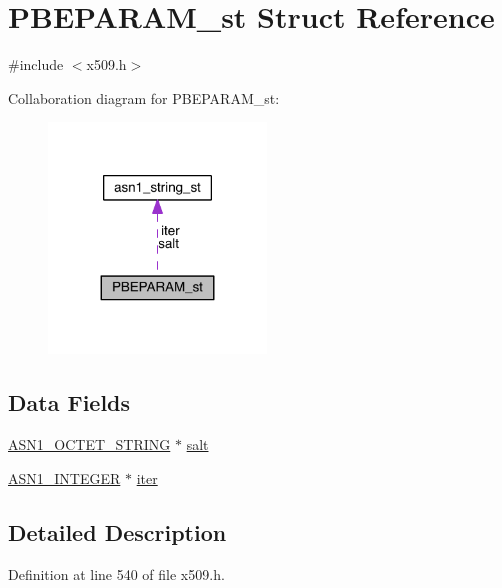 \hypertarget{struct_p_b_e_p_a_r_a_m__st}{}\section{P\+B\+E\+P\+A\+R\+A\+M\+\_\+st Struct Reference}
\label{struct_p_b_e_p_a_r_a_m__st}


{\ttfamily \#include $<$x509.\+h$>$}



Collaboration diagram for P\+B\+E\+P\+A\+R\+A\+M\+\_\+st\+:\nopagebreak
\begin{figure}[H]
\begin{center}
\leavevmode
\includegraphics[width=164pt]{struct_p_b_e_p_a_r_a_m__st__coll__graph}
\end{center}
\end{figure}
\subsection*{Data Fields}
\begin{DoxyCompactItemize}
\item 
\hyperlink{crypto_2ossl__typ_8h_afbd05e94e0f0430a2b729473efec88c1}{A\+S\+N1\+\_\+\+O\+C\+T\+E\+T\+\_\+\+S\+T\+R\+I\+NG} $\ast$ \hyperlink{struct_p_b_e_p_a_r_a_m__st_aaebd8a6f08ab440b05bacfa9bd8af07f}{salt}
\item 
\hyperlink{crypto_2ossl__typ_8h_af4335399bf9774cb410a5e93de65998b}{A\+S\+N1\+\_\+\+I\+N\+T\+E\+G\+ER} $\ast$ \hyperlink{struct_p_b_e_p_a_r_a_m__st_ab7b90cf95e75c0cd6742cfe1aad7dd03}{iter}
\end{DoxyCompactItemize}


\subsection{Detailed Description}


Definition at line 540 of file x509.\+h.



